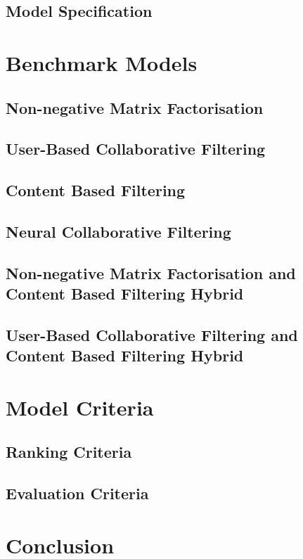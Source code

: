 \subsection{Model Specification}
\label{chp4-sec4.1}


\section{Benchmark Models}
\label{chp4-sec5}

\subsection{Non-negative Matrix Factorisation}
\label{chp4-sec5.1}

\subsection{User-Based Collaborative Filtering}
\label{chp4-sec5.2}

\subsection{Content Based Filtering}
\label{chp4-sec5.3}

\subsection{Neural Collaborative Filtering}
\label{chp4-sec5.4}

\subsection{Non-negative Matrix Factorisation and Content Based Filtering Hybrid}
\label{chp4-sec5.5}

\subsection{User-Based Collaborative Filtering and Content Based Filtering Hybrid}
\label{chp4-sec5.6}


\section{Model Criteria}
\label{chp4-sec6}

\subsection{Ranking Criteria}
\label{chp4-sec6.1}

\subsection{Evaluation Criteria}
\label{chp4-sec6.2}


\section{Conclusion}
\label{chp4-sec7}